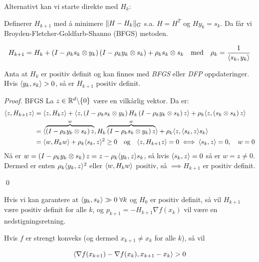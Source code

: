 Alternativt kan vi starte direkte med \(H_k \):

Definerer \( H_{k+1} \) med å minimere \( \lVert H - H_k\rVert_G \) s.a. \( H = H^T \) og \( H y_k = s_k \).
Da får vi Broyden-Fletcher-Goldfarb-Shanno (BFGS) metoden.

\[
  H_{k+1} = H_k + \left(I - \rho_k s_k \otimes y_k\right) \left(I - \rho_k y_k \otimes s_k\right) + \rho_k s_k \otimes s_k \quad \text{med} \quad \rho_k = \frac{1}{\langle s_k, y_k\rangle}
\]

\begin{lemma}{}{}
  Anta at \( H_k \) er positiv definit og kan finnes med \textit{BFGS} eller \textit{DFP} oppdateringer.
  Hvis \( \langle y_k, s_k\rangle > 0 \), så er \( H_{k+1} \) positiv definit.
\end{lemma}

\begin{proof}{BFGS}{}
  La \( z \in \mathbb{R}^d \backslash \{0\} \) være en vilkårlig vektor.
  Da er:
  \begin{align*}
    \langle z, H_{k+1} z\rangle & = \langle z, H_k z\rangle + \langle z, \left(I - \rho_k s_k \otimes y_k\right)H_k \left(I - \rho_k y_k \otimes s_k\right) z\rangle + \rho_k \langle z, \left(s_k \otimes s_k\right) z\rangle   \\
                         & = \langle\overbrace{\left(I - \rho_k y_k \otimes s_k\right) z}^{w}, H_k \overbrace{\left(I - \rho_k s_k \otimes y_k\right) z}^{w}\rangle + \rho_k \langle z, \langle s_k, z\rangle s_k\rangle \\
                         & = \langle w, H_k w\rangle + \rho_k \langle s_k, z\rangle^2 \geq 0 \quad \text{og} \quad \langle z, H_{k+1} z\rangle = 0 \iff \langle s_k, z\rangle = 0, \quad w = 0
  \end{align*}
  Nå er \( w = \left(I - \rho_k y_k \otimes s_k\right) z = z - \rho_k \langle y_k, z\rangle s_k \), så hvis \( \langle s_k, z\rangle = 0 \) så er \( w = z \neq 0 \).
  Dermed er enten \( \rho_k\langle y_k, z\rangle^2\) eller \( \langle w, H_k w\rangle \) positiv, så \(\implies H_{k+1} \) er positiv definit.

  \qed
\end{proof}


Hvis vi kan garantere at \( \langle y_k, s_k\rangle \gg 0 \; \forall k \) og \( H_0 \) er positiv definit, så vil \( H_{k+1} \) være positiv definit for alle \( k \), og \(p_{k+1} = -H_{k+1} \nabla f(x_k) \) vil være en nedstigningsretning.

Hvis \( f \) er strengt konveks (og dermed \(x_{k+1} \neq x_k \) for alle \( k \)), så vil

\[
  \langle\nabla f(x_{k+1}) - \nabla f(x_k), x_{k+1} - x_k\rangle > 0
\]

